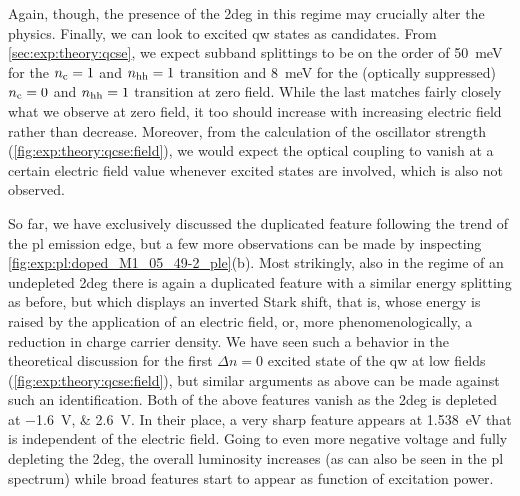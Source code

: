 Again, though, the presence of the \gls{2deg} in this regime may crucially alter the physics.
Finally, we can look to excited \gls{qw} states as candidates.
From \cref{sec:exp:theory:qcse}, we expect subband splittings to be on the order of \qty{50}{\milli\electronvolt} for the $n_{\mathrm{c}}=1$ and $n_{\mathrm{hh}}=1$ transition and \qty{8}{\milli\electronvolt} for the (optically suppressed) $n_{\mathrm{c}}=0$ and $n_{\mathrm{hh}}=1$ transition at zero field.
While the last matches fairly closely what we observe at zero field, it too should increase with increasing electric field rather than decrease.
Moreover, from the calculation of the oscillator strength (\cref{fig:exp:theory:qcse:field}), we would expect the optical coupling to vanish at a certain electric field value whenever excited states are involved, which is also not observed.

So far, we have exclusively discussed the duplicated feature following the trend of the \gls{pl} emission edge, but a few more observations can be made by inspecting \cref{fig:exp:pl:doped_M1_05_49-2_ple}(b).
Most strikingly, also in the regime of an undepleted \gls{2deg} there is again a duplicated feature with a similar energy splitting as before, but which displays an inverted Stark shift, that is, whose energy is raised by the application of an electric field, or, more phenomenologically, a reduction in charge carrier density.
We have seen such a behavior in the theoretical discussion for the first $\Delta n=0$ excited state of the \gls{qw} at low fields (\cref{fig:exp:theory:qcse:field}), but similar arguments as above can be made against such an identification.
Both of the above features vanish as the \gls{2deg} is depleted at \qtylist{-1.6;2.6}{\volt}.
In their place, a very sharp feature appears at \qty{1.538}{\electronvolt} that is independent of the electric field.
Going to even more negative voltage and fully depleting the \gls{2deg}, the overall luminosity increases (as can also be seen in the \gls{pl} spectrum) while broad features start to appear as function of excitation power.

